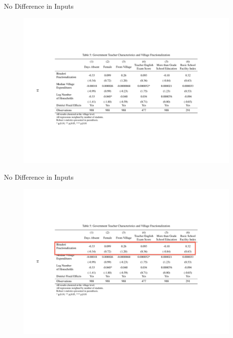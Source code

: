 \documentclass{beamer}
\begin{document}
\begin{frame}{No Difference in Inputs}
	\begin{figure}[htb]
		\begin{center}
		\includegraphics[scale=0.5]{tables/govt_teacher_quality.pdf}
		\end{center}
	\end{figure}	
\end{frame}


\begin{frame}{No Difference in Inputs}
	\begin{figure}[htb]
		\begin{center}
		\includegraphics[scale=0.5]{tables/govt_teacher_quality_box1.pdf}
		\end{center}
	\end{figure}
\end{frame}
\end{document}
